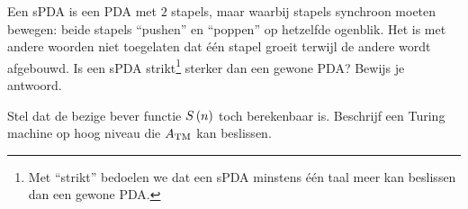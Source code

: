 \documentclass{article}
\begin{document}
\begin{question}
Een sPDA is een PDA met $2$ stapels, maar waarbij stapels synchroon moeten bewegen: beide stapels ``pushen'' en ``poppen'' op hetzelfde ogenblik. Het is met andere woorden niet toegelaten dat \'e\'en stapel groeit terwijl de andere wordt afgebouwd. Is een sPDA strikt\footnote{Met ``strikt'' bedoelen we dat een sPDA minstens \'e\'en taal meer kan beslissen dan een gewone PDA.} sterker dan een gewone PDA? Bewijs je antwoord.
\end{question}

\begin{question}
Stel dat de bezige bever functie $S\left( n \right)$ toch berekenbaar is. Beschrijf een Turing machine op hoog niveau die $A_{\rm TM}$ kan beslissen.
\end{question}
\end{document}
